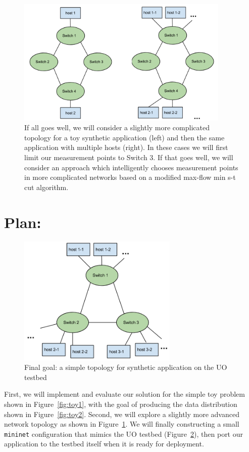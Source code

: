 \documentclass[12pt]{article} \usepackage{graphicx} \usepackage{amsmath}
\begin{document}
\begin{figure}[t] 
  \centerline{\includegraphics[width=4.0in]{img/topo_comp.png}}
  \caption{If all goes well, we will consider a slightly more complicated topology
  for a toy synthetic application (left) and then the  same application with
  multiple hosts (right). In these cases we will first limit our measurement
  points to Switch 3.  If that goes well, we will consider an approach which
  intelligently chooses measurement points in more complicated networks based on a
  modified max-flow min s-t cut algorithm.} 
  \label{fig:topo_comp} 
\end{figure}


\section*{Plan:} \label{plan} 
\begin{figure}[t]
  \centerline{\includegraphics[width=3.0in]{img/topo.png}} 
  \caption{Final goal: a simple topology for synthetic application on the
  UO testbed} \label{fig:topo}
\end{figure} 
First, we will implement and evaluate our solution for the simple
toy problem shown in Figure~\ref{fig:toy1}, with the goal of producing the data
distribution shown in Figure~\ref{fig:toy2}.  Second, we will explore a slightly
more advanced network topology as shown in Figure~\ref{fig:topo_comp}.  We will
finally constructing a small \texttt{mininet} configuration that mimics the UO
testbed (Figure~\ref{fig:topo}), then port our application to the testbed itself
when it is ready for deployment.  
\end{document}
